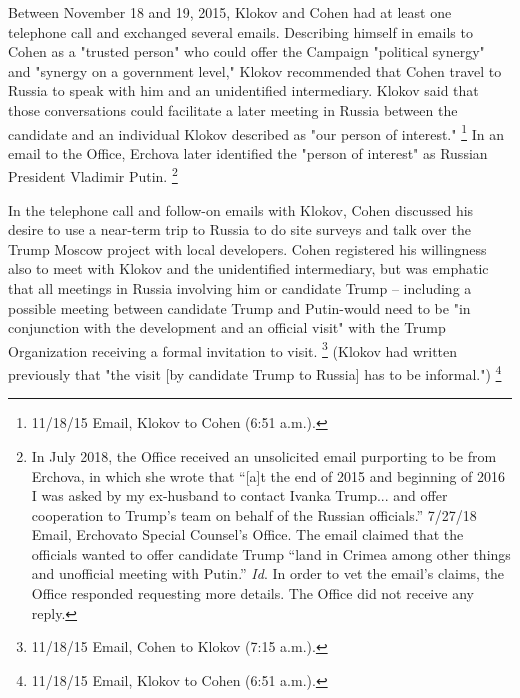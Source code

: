 Between November 18 and 19, 2015, Klokov and Cohen had at least one telephone call and exchanged several emails.
Describing himself in emails to Cohen as a "trusted person" who could offer the Campaign "political synergy" and "synergy on a government level," Klokov recommended that Cohen travel to Russia to speak with him and an unidentified intermediary.
Klokov said that those conversations could facilitate a later meeting in Russia between the candidate and an individual Klokov described as "our person of interest."%
\footnote{11/18/15 Email, Klokov to Cohen (6:51 a.m.).}
In an email to the Office, Erchova later identified the "person of interest" as Russian President Vladimir Putin.%
\footnote{In July 2018, the Office received an unsolicited email purporting to be from Erchova, in which she wrote that “[a]t the end of 2015 and beginning of 2016 I was asked by my ex-husband to contact Ivanka Trump... and offer cooperation to Trump’s team on behalf of the Russian officials.”
7/27/18 Email, Erchovato Special Counsel’s Office.
The email claimed that the officials wanted to offer candidate Trump “land in Crimea among other things and unofficial meeting with Putin.”
\textit{Id}.
In order to vet the email’s claims, the Office responded requesting more details.
The Office did not receive any reply.}

In the telephone call and follow-on emails with Klokov, Cohen discussed his desire to use a near-term trip to Russia to do site surveys and talk over the Trump Moscow project with local developers.
Cohen registered his willingness also to meet with Klokov and the unidentified intermediary, but was emphatic that all meetings in Russia involving him or candidate Trump -- including a possible meeting between candidate Trump and Putin-would need to be "in conjunction with the development and an official visit" with the Trump Organization receiving a formal invitation to visit.%
\footnote{11/18/15 Email, Cohen to Klokov (7:15 a.m.).}
(Klokov had written previously that "the visit [by candidate Trump to Russia] has to be informal.")%
\footnote{11/18/15 Email, Klokov to Cohen (6:51 a.m.).}

